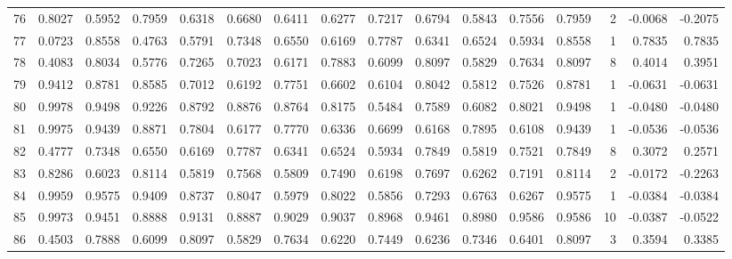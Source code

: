 \begin{tabular}{lrrrrrrrrrrrrrrr}
76  &      0.8027 &  0.5952 &  0.7959 &  0.6318 &  0.6680 &  0.6411 &  0.6277 &  0.7217 &  0.6794 &  0.5843 &   0.7556 &     0.7959 &      2 &                   -0.0068 &                    -0.2075 \\
77  &      0.0723 &  0.8558 &  0.4763 &  0.5791 &  0.7348 &  0.6550 &  0.6169 &  0.7787 &  0.6341 &  0.6524 &   0.5934 &     0.8558 &      1 &                    0.7835 &                     0.7835 \\
78  &      0.4083 &  0.8034 &  0.5776 &  0.7265 &  0.7023 &  0.6171 &  0.7883 &  0.6099 &  0.8097 &  0.5829 &   0.7634 &     0.8097 &      8 &                    0.4014 &                     0.3951 \\
79  &      0.9412 &  0.8781 &  0.8585 &  0.7012 &  0.6192 &  0.7751 &  0.6602 &  0.6104 &  0.8042 &  0.5812 &   0.7526 &     0.8781 &      1 &                   -0.0631 &                    -0.0631 \\
80  &      0.9978 &  0.9498 &  0.9226 &  0.8792 &  0.8876 &  0.8764 &  0.8175 &  0.5484 &  0.7589 &  0.6082 &   0.8021 &     0.9498 &      1 &                   -0.0480 &                    -0.0480 \\
81  &      0.9975 &  0.9439 &  0.8871 &  0.7804 &  0.6177 &  0.7770 &  0.6336 &  0.6699 &  0.6168 &  0.7895 &   0.6108 &     0.9439 &      1 &                   -0.0536 &                    -0.0536 \\
82  &      0.4777 &  0.7348 &  0.6550 &  0.6169 &  0.7787 &  0.6341 &  0.6524 &  0.5934 &  0.7849 &  0.5819 &   0.7521 &     0.7849 &      8 &                    0.3072 &                     0.2571 \\
83  &      0.8286 &  0.6023 &  0.8114 &  0.5819 &  0.7568 &  0.5809 &  0.7490 &  0.6198 &  0.7697 &  0.6262 &   0.7191 &     0.8114 &      2 &                   -0.0172 &                    -0.2263 \\
84  &      0.9959 &  0.9575 &  0.9409 &  0.8737 &  0.8047 &  0.5979 &  0.8022 &  0.5856 &  0.7293 &  0.6763 &   0.6267 &     0.9575 &      1 &                   -0.0384 &                    -0.0384 \\
85  &      0.9973 &  0.9451 &  0.8888 &  0.9131 &  0.8887 &  0.9029 &  0.9037 &  0.8968 &  0.9461 &  0.8980 &   0.9586 &     0.9586 &     10 &                   -0.0387 &                    -0.0522 \\
86  &      0.4503 &  0.7888 &  0.6099 &  0.8097 &  0.5829 &  0.7634 &  0.6220 &  0.7449 &  0.6236 &  0.7346 &   0.6401 &     0.8097 &      3 &                    0.3594 &                     0.3385 \\

\end{tabular}
